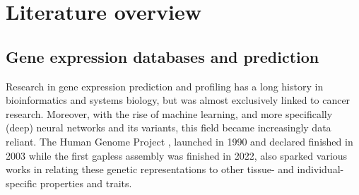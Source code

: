 \documentclass[]{article}
\renewcommand{\cite}{\citep}
\begin{document}
%
%
%
%
%	

\newpage
\section{Literature overview}
\label{sec:relatedwork}
\subsection{Gene expression databases and prediction}
\label{sec:relatedwork_geneexp}
Research in gene expression prediction and profiling has a long history in bioinformatics and systems biology, but was almost exclusively linked to cancer research. Moreover, with the rise of machine learning, and more specifically (deep) neural networks and its variants, this field became increasingly data reliant. The Human Genome Project \cite{watson1990human}, launched in 1990 and declared finished in 2003 while the first gapless assembly was finished in 2022, also sparked various works in relating these genetic representations to other tissue- and individual-specific properties and traits.\\ 
\end{document}
